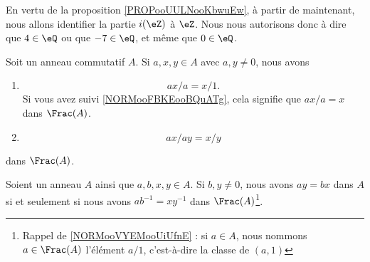 \begin{normaltext}		\label{NORMooVYEMooUiUfnE}
	En vertu de la proposition \ref{PROPooUULNooKbwuEw}, à partir de maintenant, nous allons identifier la partie \( i(\eZ)\) à \( \eZ\). Nous nous autorisons donc à dire que \( 4\in \eQ\) ou que \( -7\in \eQ\), et même que \( 0\in \eQ\).
\end{normaltext}

\begin{proposition}	\label{PROPooTXGUooRvViwT}
	Soit un anneau commutatif \( A\). Si \( a,x,y\in A\) avec \( a,y\neq 0\), nous avons
	\begin{enumerate}
		\item
		      \begin{equation}
			      ax/a=x/1.
		      \end{equation}
		      Si vous avez suivi \ref{NORMooFBKEooBQuATg}, cela signifie que \( ax/a=x\) dans \( \Frac(A)\).
		\item
		      \begin{equation}
			      ax/ay=x/y
		      \end{equation}
	\end{enumerate}
	dans \( \Frac(A)\).
\end{proposition}


\begin{lemma}       \label{LEMooBJRCooIZnaid}
	Soient un anneau \( A\) ainsi que \( a,b,x,y\in A\). Si \( b,y\neq 0\), nous avons \( ay=bx\) dans \( A\) si et seulement si nous avons \( ab^{-1}=xy^{-1}\) dans \( \Frac(A)\)\footnote{Rappel de \ref{NORMooVYEMooUiUfnE} : si \( a\in A\), nous nommons \( a\in \Frac(A)\) l'élément \( a/1\), c'est-à-dire la classe de \( (a,1)\)}.
\end{lemma}

